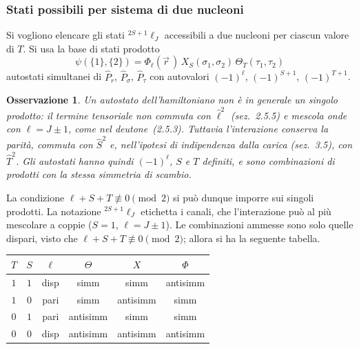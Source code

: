 \documentclass[11pt, a4paper]{scrartcl}
\theoremstyle{style}
\newtheorem{osservazione}{Osservazione}[section]
\numberwithin{equation}{subsection}
\begin{document}
\subsubsection{Stati possibili per sistema di due nucleoni}
Si vogliono elencare gli stati ${}^{2S+1}\ell_J$ accessibili a due nucleoni per ciascun
valore di $T$. Si usa la base di stati prodotto
\begin{equation*}
    \psi(\{1\},\{2\}) = \Phi_\ell(\vec{r}\,)\, X_S(\sigma_1,\sigma_2)\, \Theta_T(\tau_1,\tau_2)
\end{equation*}
autostati simultanei di $\hat{P}_r$, $\hat{P}_\sigma$, $\hat{P}_\tau$ con autovalori
$(-1)^{\ell}$, $(-1)^{S+1}$, $(-1)^{T+1}$.

\begin{osservazione}
Un autostato dell'hamiltoniano non è in generale un singolo prodotto: il termine
tensoriale non commuta con $\hat{\ell}^2$ (sez.~2.5.5) e mescola onde con
$\ell = J \pm 1$, come nel deutone~(2.5.3). Tuttavia l'interazione conserva la parità,
commuta con $\hat{S}^2$ e, nell'ipotesi di indipendenza dalla carica (sez.~3.5), con
$\hat{T}^2$. Gli autostati hanno quindi $(-1)^{\ell}$, $S$ e $T$ definiti, e sono
combinazioni di prodotti con la stessa simmetria di scambio.
\end{osservazione}

\noindent La condizione $\ell + S + T \not\equiv 0 \pmod{2}$ si può dunque imporre sui singoli
prodotti. La notazione ${}^{2S+1}\ell_J$ etichetta i canali, che l'interazione può al
più mescolare a coppie ($S = 1$, $\ell = J \pm 1$).
Le combinazioni ammesse sono solo quelle dispari, visto che $\ell + S+ T\not\equiv 0 \pmod{2} $; allora si ha la seguente tabella.
\begin{table}[h!]
	\centering
	\begin{tabular}{c c c | c c c}
		$T$& $S$ &$\ell $ & $\Theta $& $X$& $\Phi $\\
	\hline
		$1$ & $1$ & disp & simm & simm & antisimm\\
		$1$ & $0$ & pari & simm & antisimm & simm\\
		$0$ & $1$ & pari & antisimm & simm & simm\\
		$0$ & $0$ & disp & antisimm & antisimm & antisimm
	\end{tabular}
\end{table}
\end{document}
